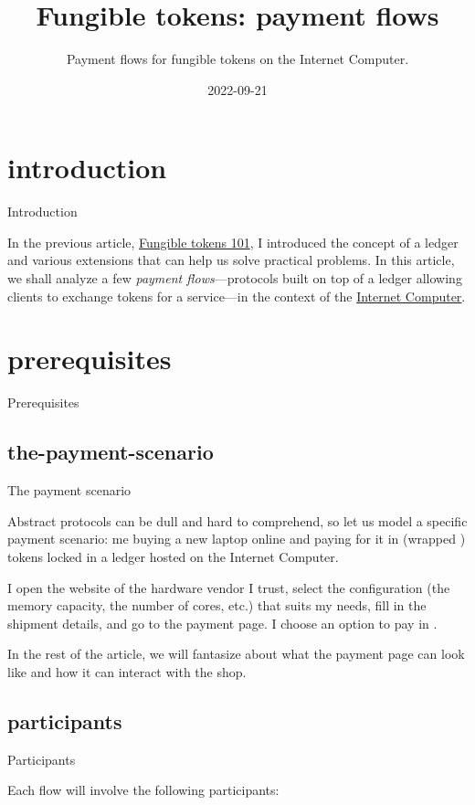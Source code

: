 \documentclass{article}
\title{Fungible tokens: payment flows}
\subtitle{Payment flows for fungible tokens on the Internet Computer.}
\date{2022-09-21}
\begin{document}
\section{introduction}{Introduction}

In the previous article, \href{/posts/09-fungible-tokens-101.html}{Fungible tokens 101}, I introduced the concept of a ledger and various extensions that can help us solve practical problems.
In this article, we shall analyze a few \emph{payment flows}---protocols built on top of a ledger allowing clients to exchange tokens for a service---in the context of the \href{https://internetcomputer.org}{Internet Computer}.

\section{prerequisites}{Prerequisites}
\subsection{the-payment-scenario}{The payment scenario}

Abstract protocols can be dull and hard to comprehend, so let us model a specific payment scenario: me buying a new laptop online and paying for it in  (wrapped \href{https://en.wikipedia.org/wiki/Special_drawing_rights}{}) tokens locked in a ledger hosted on the Internet Computer.

I open the website of the hardware vendor I trust, select the configuration (the memory capacity, the number of cores, etc.) that suits my needs, fill in the shipment details, and go to the payment page.
I choose an option to pay in .

In the rest of the article, we will fantasize about what the payment page can look like and how it can interact with the shop.

\subsection{participants}{Participants}

Each flow will involve the following participants:
\end{document}

